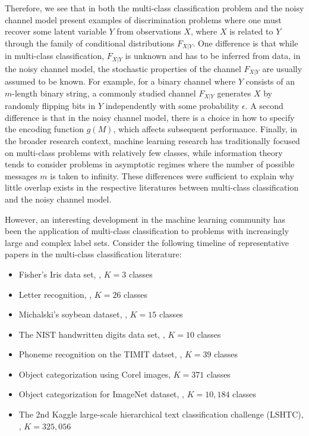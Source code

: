 Therefore, we see that in both the multi-class classification problem
and the noisy channel model present examples of discrimination
problems where one must recover some latent variable $Y$ from
observations $X$, where $X$ is related to $Y$ through the family of
conditional distributions $F_{X|Y}$.  One difference is that while in
multi-class classification, $F_{X|Y}$ is unknown and has to be
inferred from data, in the noisy channel model, the stochastic
properties of the channel $F_{X|Y}$ are usually assumed to be known.
For example, for a binary channel where $Y$ consists of an $m$-length
binary string, a commonly studied channel $F_{X|Y}$ generates $X$ by
randomly flipping bits in $Y$ independently with some probability
$\epsilon$.  A second difference is that in the noisy channel model,
there is a choice in how to specify the encoding function $g(M)$,
which affects subsequent performance.  Finally, in the broader
research context, machine learning research has traditionally focused
on multi-class problems with relatively few classes, while information
theory tends to consider problems in asymptotic regimes where the
number of possible messages $m$ is taken to infinity. These
differences were sufficient to explain why little overlap exists in
the respective literatures between multi-class classification and the
noisy channel model.  

However, an interesting development in the machine learning community
has been the application of multi-class classification to problems
with increasingly large and complex label sets.  Consider the
following timeline of representative papers in the multi-class
classification literature:
\begin{itemize}
\item Fisher's Iris data set, \cite{fisher1936use}, $K = 3$ classes
\item Letter recognition, \cite{frey1991letter}, $K = 26$ classes
\item Michalski's soybean dataset, \cite{mickalstd1980learning}, $K = 15$ classes
\item The NIST handwritten digits data set, \cite{grother1995nist}, $K = 10$ classes
\item Phoneme recognition on the TIMIT datset, \cite{clarkson1999use}, $K = 39$ classes
\item Object categorization using Corel images, \cite{duygulu2002object} $K = 371$ classes
\item Object categorization for ImageNet dataset, \cite{deng2010does}, $K = 10,184$ classes
\item The 2nd Kaggle large-scale hierarchical text classification challenge (LSHTC), \cite{partalas2015lshtc}, $K = 325,056$
\end{itemize}


